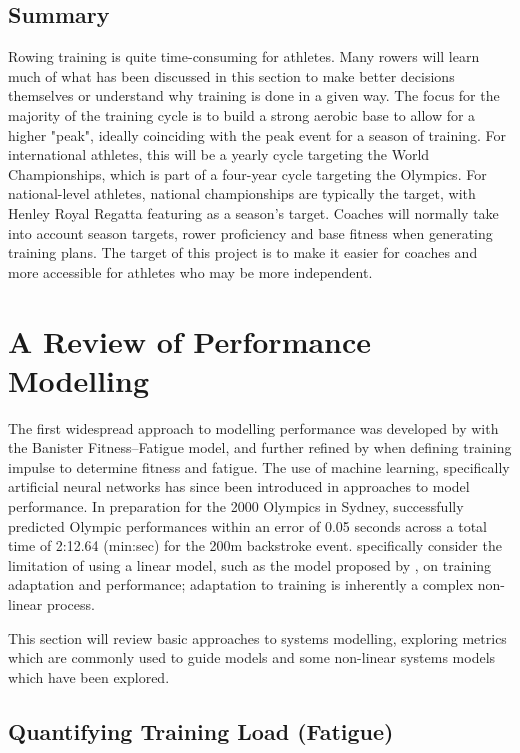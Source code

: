 \subsection{Summary}
Rowing training is quite time-consuming for athletes. Many rowers will learn much of what has been discussed in this section to make better decisions themselves or understand why training is done in a given way. The focus for the majority of the training cycle is to build a strong aerobic base to allow for a higher "peak", ideally coinciding with the peak event for a season of training. For international athletes, this will be a yearly cycle targeting the World Championships, which is part of a four-year cycle targeting the Olympics. For national-level athletes, national championships are typically the target, with Henley Royal Regatta featuring as a season's target. Coaches will normally take into account season targets, rower proficiency and base fitness when generating training plans. The target of this project is to make it easier for coaches and more accessible for athletes who may be more independent. 

\section{A Review of Performance Modelling}
The first widespread approach to modelling performance was developed by \textcite{Bannister1976} with the Banister Fitness--Fatigue model, and further refined by \textcite{Morton1990} when defining training impulse to determine fitness and fatigue. The use of machine learning, specifically artificial neural networks has since been introduced in approaches to model performance. In preparation for the 2000 Olympics in Sydney, \textcite{Edelmannnusser2002} successfully predicted Olympic performances within an error of 0.05 seconds across a total time of 2:12.64 (min:sec) for the 200m backstroke event. \textcite{Edelmannnusser2002} specifically consider the limitation of using a linear model, such as the model proposed by \textcite{Bannister1976}, on training adaptation and performance; adaptation to training is inherently a complex non-linear process. 

This section will review basic approaches to systems modelling, exploring metrics which are commonly used to guide models and some non-linear systems models which have been explored. 

\subsection{\label{sec:quant-training}Quantifying Training Load (Fatigue)}
